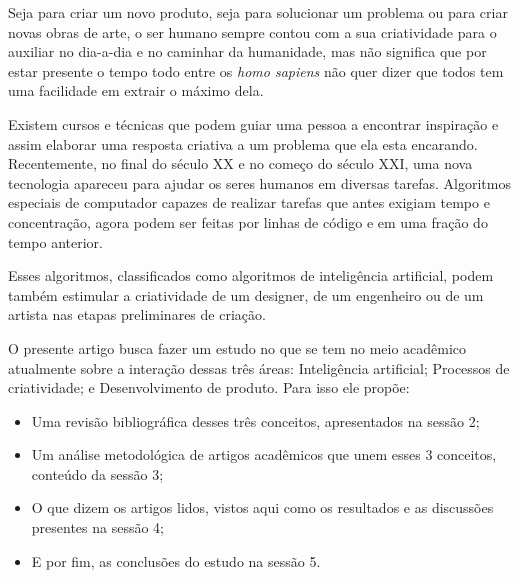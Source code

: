Seja para criar um novo produto, seja para solucionar um problema ou para criar novas obras de arte, o ser humano sempre contou com a sua criatividade para o auxiliar no dia-a-dia e no caminhar da humanidade, mas não significa que por estar presente o tempo todo entre os \textit{homo sapiens} não quer dizer que todos tem uma facilidade em extrair o máximo dela. 

Existem cursos e técnicas que podem guiar uma pessoa a encontrar inspiração e assim elaborar uma resposta criativa a um problema que ela esta encarando. Recentemente, no final do século XX e no começo do século XXI, uma nova tecnologia apareceu para ajudar os seres humanos em diversas tarefas. Algoritmos especiais de computador capazes de realizar tarefas que antes exigiam tempo e concentração, agora podem ser feitas por linhas de código e em uma fração do tempo anterior. 

Esses algoritmos, classificados como algoritmos de inteligência artificial, podem também estimular a criatividade de um designer, de um engenheiro ou de um artista nas etapas preliminares de criação.

O presente artigo busca fazer um estudo no que se tem no meio acadêmico atualmente sobre a interação dessas três áreas: Inteligência artificial; Processos de criatividade; e Desenvolvimento de produto. Para isso ele propõe:

\begin{itemize}
    \item Uma revisão bibliográfica desses três conceitos, apresentados na sessão 2;
    \item Um análise metodológica de artigos acadêmicos que unem esses 3 conceitos, conteúdo da sessão 3;
    \item O que dizem os artigos lidos, vistos aqui como os resultados e as discussões presentes na sessão 4;
    \item E por fim, as conclusões do estudo na sessão 5.
\end{itemize}